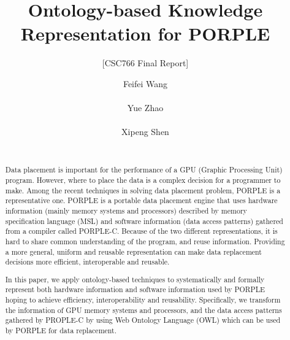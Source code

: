 \documentclass{sig-alternate}
\begin{document}

\title{Ontology-based Knowledge Representation for PORPLE}
\subtitle{[CSC766 Final Report]}

\author{
\alignauthor
Feifei Wang\\
       \\
\alignauthor
Yue Zhao\\
       \\
\alignauthor
Xipeng Shen\\
       \\
}
\maketitle
\begin{abstract}
Data placement is important for the performance of a GPU (Graphic Processing Unit) program. However, where to place the data is a complex decision for a programmer to make. Among the recent techniques in solving data placement problem, PORPLE is a representative one. PORPLE is a portable data placement engine that uses hardware information (mainly memory systems and processors) described by memory specification language (MSL) and software information (data access patterns) gathered from a compiler called PORPLE-C. Because of the two different representations, it is hard to share common understanding of the program, and reuse information. Providing a more general, uniform and reusable representation can make data replacement decisions more efficient, interoperable and reusable.

In this paper, we apply ontology-based techniques to systematically and formally represent both hardware information and software information used by PORPLE hoping to achieve efficiency, interoperability and reusability. Specifically, we transform the information of GPU memory systems and processors, and the data access patterns gathered by PROPLE-C by using Web Ontology Language (OWL) which can be used by PORPLE for data replacement.
 
\end{abstract}


\end{document}
